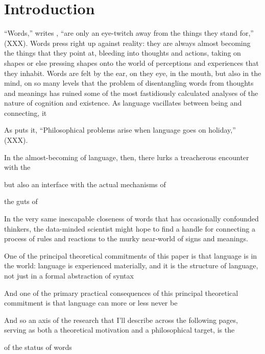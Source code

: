 \chapter{Introduction}
``Words,'' writes \cite{Pynchon}, ``are only an eye-twitch away from the things they stand for,'' (XXX).  Words press right up against reality: they are always almost becoming the things that they point at, bleeding into thoughts and actions, taking on shapes or else pressing shapes onto the world of perceptions and experiences that they inhabit.  Words are felt by the ear, on they eye, in the mouth, but also in the mind, on so many levels that the problem of disentangling words from thoughts and meanings has ruined some of the most fastidiously calculated analyses of the nature of cognition and existence.  As language vacillates between being and connecting, it 

As \cite{Wittgenstein} puts it, ``Philosophical problems arise when language goes on holiday,'' (XXX).

In the almost-becoming of language, then, there lurks a treacherous encounter with the 

but also an interface with the actual mechanisms of 

the guts of 

In the very same inescapable closeness of words that has occasionally confounded thinkers, the data-minded scientist might hope to find a handle for connecting a process of rules and reactions to the murky near-world of signs and meanings.

One of the principal theoretical commitments of this paper is that language is in the world: language is experienced materially, and it is the structure of language, not just in a formal abstraction of syntax

And one of the primary practical consequences of this principal theoretical commitment is that language can more or less never be 

And so an axis of the research that I'll describe across the following pages, serving as both a theoretical motivation and a philosophical target, is the 

of the status of words

